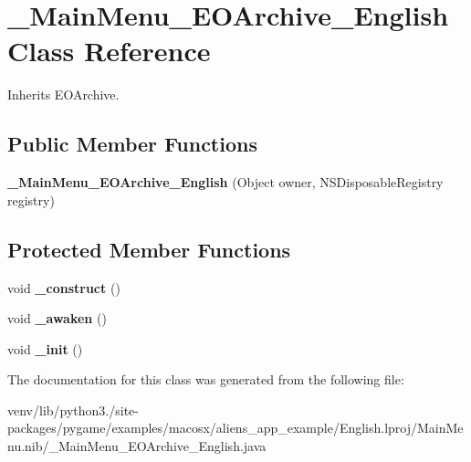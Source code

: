 \hypertarget{class___main_menu___e_o_archive___english}{}\section{\+\_\+\+Main\+Menu\+\_\+\+E\+O\+Archive\+\_\+\+English Class Reference}
\label{class___main_menu___e_o_archive___english}


Inherits E\+O\+Archive.

\subsection*{Public Member Functions}
\begin{DoxyCompactItemize}
\item 
\mbox{\label{class___main_menu___e_o_archive___english_abf78e8520883defba59fc10f6823d4fc}} 
{\bfseries \+\_\+\+Main\+Menu\+\_\+\+E\+O\+Archive\+\_\+\+English} (Object owner, N\+S\+Disposable\+Registry registry)
\end{DoxyCompactItemize}
\subsection*{Protected Member Functions}
\begin{DoxyCompactItemize}
\item 
\mbox{\label{class___main_menu___e_o_archive___english_a1eac93c56358746ef42699c6e3ff1c32}} 
void {\bfseries \+\_\+construct} ()
\item 
\mbox{\label{class___main_menu___e_o_archive___english_abe3a857e112a7729a8a2c9c411e1b8a4}} 
void {\bfseries \+\_\+awaken} ()
\item 
\mbox{\label{class___main_menu___e_o_archive___english_a3ccbd75cf7042688f6bb8be791a77bfb}} 
void {\bfseries \+\_\+init} ()
\end{DoxyCompactItemize}


The documentation for this class was generated from the following file\+:\begin{DoxyCompactItemize}
\item 
venv/lib/python3./site-\/packages/pygame/examples/macosx/aliens\+\_\+app\+\_\+example/\+English.\+lproj/\+Main\+Menu.\+nib/\+\_\+\+Main\+Menu\+\_\+\+E\+O\+Archive\+\_\+\+English.\+java\end{DoxyCompactItemize}
